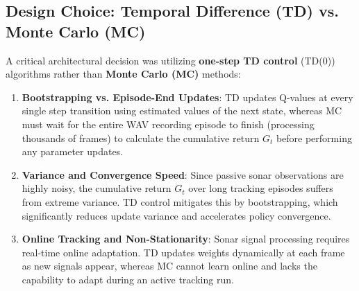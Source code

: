 \documentclass[12pt,a4paper]{article}
\begin{document}
\subsection{Design Choice: Temporal Difference (TD) vs. Monte Carlo (MC)}
A critical architectural decision was utilizing \textbf{one-step TD control} (TD(0)) algorithms rather than \textbf{Monte Carlo (MC)} methods:
\begin{enumerate}
    \item \textbf{Bootstrapping vs. Episode-End Updates}: TD updates Q-values at every single step transition using estimated values of the next state, whereas MC must wait for the entire WAV recording episode to finish (processing thousands of frames) to calculate the cumulative return $G_t$ before performing any parameter updates.
    \item \textbf{Variance and Convergence Speed}: Since passive sonar observations are highly noisy, the cumulative return $G_t$ over long tracking episodes suffers from extreme variance. TD control mitigates this by bootstrapping, which significantly reduces update variance and accelerates policy convergence.
    \item \textbf{Online Tracking and Non-Stationarity}: Sonar signal processing requires real-time online adaptation. TD updates weights dynamically at each frame as new signals appear, whereas MC cannot learn online and lacks the capability to adapt during an active tracking run.
\end{enumerate}
\end{document}
